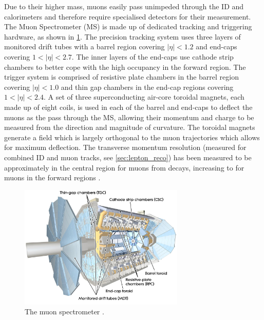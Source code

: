 Due to their higher mass, muons easily pass unimpeded through the ID and calorimeters and therefore require specialised detectors for their measurement.
The Muon Spectrometer (MS) is made up of dedicated tracking and triggering hardware, as shown in \cref{fig:atlas_muon_system}.
The precision tracking system uses three layers of monitored drift tubes with a barrel region covering $|\eta| < 1.2$ and end-caps covering $1 < |\eta| < 2.7$. The inner layers of the end-caps use cathode strip chambers to better cope with the high occupancy in the forward region.
The trigger system is comprised of resistive plate chambers in the barrel region covering $|\eta| < 1.0$ and thin gap chambers in the end-cap regions covering $1 < |\eta| < 2.4$.
A set of three superconducting air-core toroidal magnets, each made up of eight coils, is used in each of the barrel and end-caps to deflect the muons as the pass through the MS, allowing their momentum and charge to be measured from the direction and magnitude of curvature.
The toroidal magnets generate a field which is largely orthogonal to the muon trajectories which allows for maximum deflection.
The transverse momentum resolution (measured for combined ID and muon tracks, see \cref{sec:lepton_reco}) has been measured to be approximately  in the central region for muons from \Jpsi decays, increasing to  for muons in the forward regions \cite{PERF-2015-10}.
%
\begin{figure}[!htpb]
  \centering
  \includegraphics[width=0.7\textwidth]{chapters/2.detector/figs/atlas_muon_system.jpg}
  \caption{The \ATLAS muon spectrometer \cite{atlasmuon}.}
  \label{fig:atlas_muon_system}
\end{figure}
%


